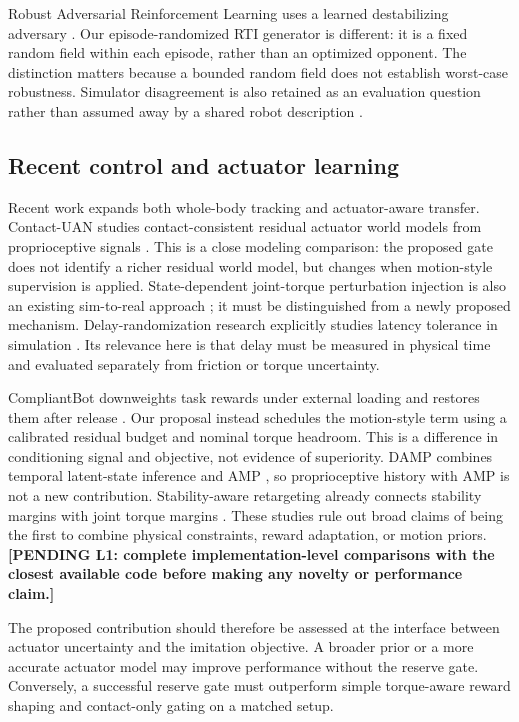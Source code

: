 \documentclass[11pt,a4paper]{article}
\newcommand{\pending}[1]{\textbf{[PENDING #1]}}
\begin{document}
Robust Adversarial Reinforcement Learning uses a learned destabilizing adversary \cite{rarl}. Our episode-randomized RTI generator is different: it is a fixed random field within each episode, rather than an optimized opponent. The distinction matters because a bounded random field does not establish worst-case robustness. Simulator disagreement is also retained as an evaluation question rather than assumed away by a shared robot description \cite{mujoco}.

\subsection{Recent control and actuator learning}
Recent work expands both whole-body tracking and actuator-aware transfer. Contact-UAN studies contact-consistent residual actuator world models from proprioceptive signals \cite{contactuan}. This is a close modeling comparison: the proposed gate does not identify a richer residual world model, but changes when motion-style supervision is applied. State-dependent joint-torque perturbation injection is also an existing sim-to-real approach \cite{torqueperturb}; it must be distinguished from a newly proposed mechanism. Delay-randomization research explicitly studies latency tolerance in simulation \cite{delay}. Its relevance here is that delay must be measured in physical time and evaluated separately from friction or torque uncertainty.

CompliantBot downweights task rewards under external loading and restores them after release \cite{compliantbot}. Our proposal instead schedules the motion-style term using a calibrated residual budget and nominal torque headroom. This is a difference in conditioning signal and objective, not evidence of superiority. DAMP combines temporal latent-state inference and AMP \cite{damp}, so proprioceptive history with AMP is not a new contribution. Stability-aware retargeting already connects stability margins with joint torque margins \cite{retarget}. These studies rule out broad claims of being the first to combine physical constraints, reward adaptation, or motion priors. \pending{L1: complete implementation-level comparisons with the closest available code before making any novelty or performance claim.}

The proposed contribution should therefore be assessed at the interface between actuator uncertainty and the imitation objective. A broader prior or a more accurate actuator model may improve performance without the reserve gate. Conversely, a successful reserve gate must outperform simple torque-aware reward shaping and contact-only gating on a matched setup.
\end{document}
